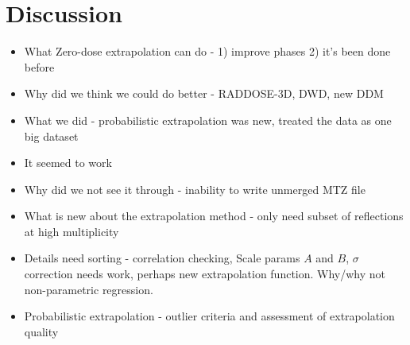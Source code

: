 \section{Discussion}
\label{sec:Discussion - Zero-dose extrapolation}

\begin{itemize}
    \item What Zero-dose extrapolation can do - 1) improve phases 2) it's been done before
    \item Why did we think we could do better - RADDOSE-3D, DWD, new DDM
    \item What we did - probabilistic extrapolation was new, treated the data as one big dataset
    \item It seemed to work
    \item Why did we not see it through - inability to write unmerged MTZ file
    \item What is new about the extrapolation method - only need subset of reflections at high multiplicity
    \item Details need sorting - correlation checking, Scale params $A$ and $B$, $\sigma$ correction needs work, perhaps new extrapolation function. Why/why not non-parametric regression.
    \item Probabilistic extrapolation - outlier criteria and assessment of extrapolation quality
\end{itemize}
